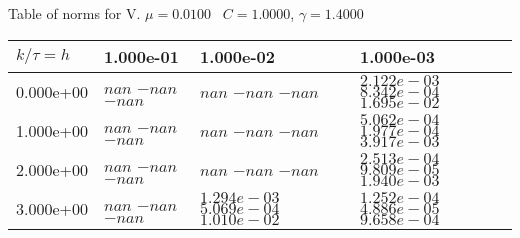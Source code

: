 \begin{center}
Table of norms for V. $\mu = 0.0100$ \, $C = 1.0000$, $\gamma = 1.4000$
  
\begin{tabular}{|p{1in}|p{1in}|p{1in}|p{1in}|} \hline
$k / \tau = h$ &1.000e-01 &1.000e-02 &1.000e-03 \\ \hline 
0.000e+00 & $nan$  $-nan$  $-nan$  & $nan$  $-nan$  $-nan$  & $2.122e-03$  $8.342e-04$  $1.695e-02$  \\ \hline 
1.000e+00 & $nan$  $-nan$  $-nan$  & $nan$  $-nan$  $-nan$  & $5.062e-04$  $1.977e-04$  $3.917e-03$  \\ \hline 
2.000e+00 & $nan$  $-nan$  $-nan$  & $nan$  $-nan$  $-nan$  & $2.513e-04$  $9.809e-05$  $1.940e-03$  \\ \hline 
3.000e+00 & $nan$  $-nan$  $-nan$  & $1.294e-03$  $5.069e-04$  $1.010e-02$  & $1.252e-04$  $4.886e-05$  $9.658e-04$  \\ \hline 

\end{tabular}\\[20pt]
\end{center}
